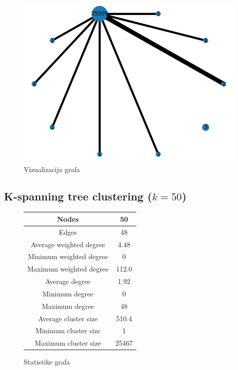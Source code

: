 \documentclass[a4paper,12pt]{article}
\begin{document}
	\begin{figure}[H]
		\centering
		\includegraphics[scale=0.7]{spanning_merged_graph_10_visualization}
		\caption{Vizualizacija grafa}
	\end{figure}


	\subsection{K-spanning tree clustering ($k = 50$)}
	\begin{figure}[H]
		\centering
		\begin{tabular}{ |c|c| } 
			\hline
			Nodes& 50 \\
			\hline
			Edges& 48 \\
			\hline
			Average weighted degree& 4.48 \\
			Minimum weighted degree& 0  \\
			Maximum weighted degree& 112.0 \\
			\hline
			Average degree& 1.92 \\
			Minimum degree& 0 \\ 
			Maximum degree& 48 \\
			\hline
			Average cluster size& 510.4 \\
			Minimum cluster size& 1 \\
			Maximum cluster size& 25467 \\
			\hline
			
		\end{tabular}
		\caption{Statistike grafa}
	\end{figure}	
	
\end{document}
